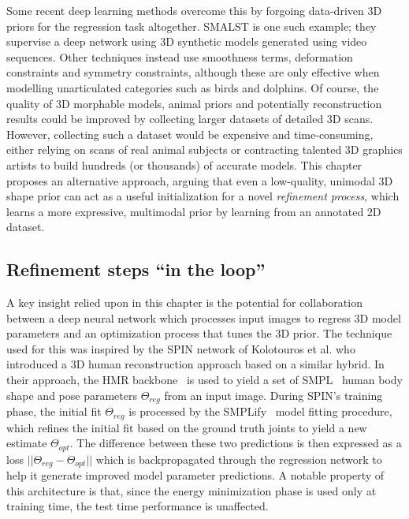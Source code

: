 Some recent deep learning methods overcome this by forgoing data-driven 3D priors for the regression task altogether. SMALST is one such example; they supervise a deep network using 3D synthetic models generated using video sequences. Other techniques  instead use smoothness terms, deformation constraints and symmetry constraints, although these are only effective when modelling unarticulated categories such as birds and dolphins. Of course, the quality of 3D morphable models, animal priors and potentially reconstruction results could be improved by collecting larger datasets of detailed 3D scans. However, collecting such a dataset would be expensive and time-consuming, either relying on scans of real animal subjects or contracting talented 3D graphics artists to build hundreds (or thousands) of accurate models. This chapter proposes an alternative approach, arguing that even a low-quality, unimodal 3D shape prior can act as a useful initialization for a novel \emph{refinement process}, which learns a more expressive, multimodal prior by learning from an annotated 2D dataset.

\subsection{Refinement steps ``in the loop''}

A key insight relied upon in this chapter is the potential for collaboration between a deep neural network which processes input images to regress 3D model parameters and an optimization process that tunes the 3D prior. The technique used for this was inspired by the SPIN network of Kolotouros et al. who introduced a 3D human reconstruction approach based on a similar hybrid. In their approach, the HMR backbone~ is used to yield a set of SMPL~ human body shape and pose parameters $\Theta_{reg}$ from an input image. During SPIN's training phase, the initial fit $\Theta_{reg}$ is processed by the SMPLify~ model fitting procedure, which refines the initial fit based on the ground truth joints to yield a new estimate $\Theta_{opt}$. The difference between these two predictions is then expressed as a loss $||\Theta_{reg} - \Theta_{opt}||$ which is backpropagated through the regression network to help it generate improved model parameter predictions. A notable property of this architecture is that, since the energy minimization phase is used only at training time, the test time performance is unaffected.

